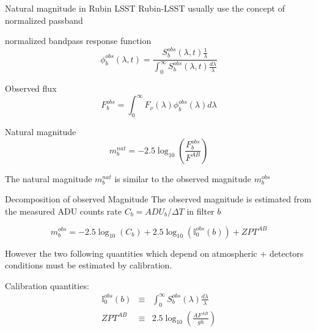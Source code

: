 \documentclass{beamer}
\begin{document}
\begin{frame}{Natural magnitude in Rubin LSST}
Rubin-LSST usually use the concept of normalized passband
\begin{alertblock}{normalized bandpass response function}
\begin{equation}
\phi_b^{obs} (\lambda,t) = \frac{S_b^{obs}(\lambda,t)\frac{1}{\lambda}}{\int_0^\infty S^{obs}_b(\lambda,t) \frac{d\lambda}{\lambda}}
\end{equation}
\end{alertblock}
\begin{block}{Observed flux}
\begin{equation}
F_b^{obs} = \int_0^\infty F_\nu(\lambda) \phi_b^{obs}(\lambda) d\lambda
\end{equation}
\end{block}
\begin{exampleblock}{Natural magnitude}
\begin{equation}
m_b^{nat} = -2.5 \log_{10} \left( \frac{F_b^{obs}}{F^{AB}}\right)
\end{equation}
\end{exampleblock}
The natural magnitude $m_b^{nat}$ is similar to  the observed magnitude $m_b^{obs}$
\end{frame}



\begin{frame}{Decomposition of observed Magnitude} 
The observed magnitude is estimated from the measured ADU counts rate $C_b=ADU_b/\Delta T$ in filter $b$
\begin{alertblock}{}
\begin{equation}
m^{obs}_b = -2.5 \log_{10}(C_b)+ 2.5 \log_{10}\left(\mathbb{I}_0^{obs}(b)\right) + ZPT^{AB}
\end{equation}	
\end{alertblock}	
However the two following quantities which depend on atmospheric + detectors conditions must be estimated by calibration. 
\begin{block}{Calibration quantities:}
\begin{eqnarray}
\mathbb{I}_0^{obs}(b) & \equiv & \int_0^\infty S^{obs}_b(\lambda) \frac{d\lambda}{\lambda} \\
ZPT^{AB} & \equiv & 2.5 \log_{10} \left( \frac{A F^{AB}}{gh}\right)
\end{eqnarray} 
\end{block}

\end{frame}
\end{document}
